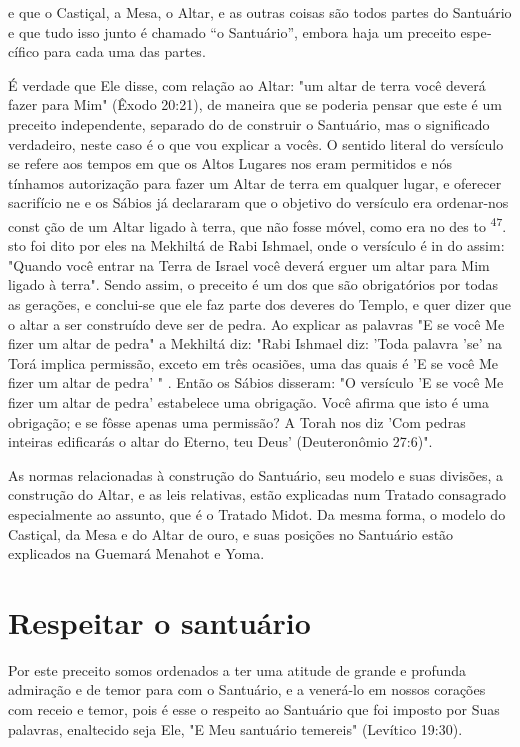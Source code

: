 e que o Castiçal, a Mesa, o Altar, e as outras coisas são todos partes
do Santuário e que tudo isso junto é chamado ``o Santuário'', embora haja
um preceito espe­cífico para cada uma das partes.

É verdade que Ele disse, com relação ao Altar: "um altar de terra vo­cê
deverá fazer para Mim" (Êxodo 20:21), de maneira que se poderia pensar
que este é um preceito independente, separado do de construir o
Santuário, mas o significado verdadeiro, neste caso é o que vou explicar
a vocês. O senti­do literal do versículo se refere aos tempos em que os
Altos Lugares nos eram permitidos e nós tínhamos autorização para fazer
um Altar de terra em qual­quer lugar, e oferecer sacrifício ne e os
Sábios já declararam que o objetivo do versículo era ordenar-nos const
ção de um Altar ligado à terra, que não fosse móvel, como era no des to
\textsuperscript{47}. sto foi dito por eles na Mekhiltá de Rabi Ishmael,
onde o versículo é in do assim: "Quando você entrar na Terra de Israel
você deverá erguer um altar para Mim ligado à terra". Sendo assim, o
preceito é um dos que são obrigatórios por todas as gerações, e
conclui-se que ele faz parte dos deveres do Templo, e quer dizer que o
altar a ser construí­do deve ser de pedra. Ao explicar as palavras "E se
você Me fizer um altar de pedra" a Mekhiltá diz: "Rabi Ishmael diz:
'Toda palavra 'se' na Torá implica permissão, exceto em três ocasiões,
uma das quais é 'E se você Me fizer um altar de pedra' " . Então os
Sábios disseram: "O versículo 'E se você Me fizer um altar de pedra'
estabelece uma obrigação. Você afirma que isto é uma obri­gação; e se
fôsse apenas uma permissão? A Torah nos diz 'Com pedras inteiras
edificarás o altar do Eterno, teu Deus' (Deuteronômio 27:6)".

As normas relacionadas à construção do Santuário, seu modelo e suas
divisões, a construção do Altar, e as leis relativas, estão explicadas
num Trata­do consagrado especialmente ao assunto, que é o Tratado Midot.
Da mesma forma, o modelo do Castiçal, da Mesa e do Altar de ouro, e suas
posições no Santuário estão explicados na Guemará Menahot e Yoma.

\section{Respeitar o santuário}

Por este preceito somos ordenados a ter uma atitude de grande e profunda
admiração e de temor para com o Santuário, e a venerá-lo em nossos
corações com receio e temor, pois é esse o respeito ao Santuário que foi
im­posto por Suas palavras, enaltecido seja Ele, "E Meu santuário
temereis" (Leví­tico 19:30).

